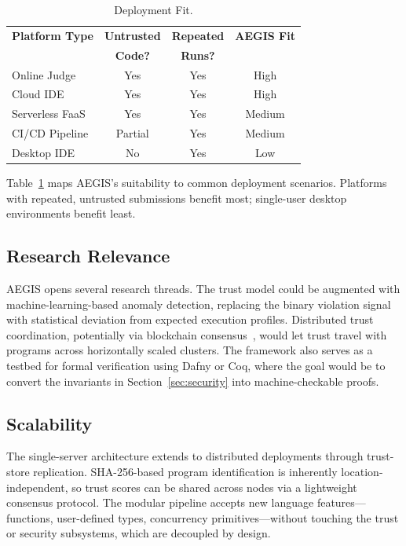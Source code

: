 \documentclass[conference]{IEEEtran}
\begin{document}
\begin{table}[t]
\caption{Deployment Fit.}
\label{tab:deploy_fit}
\centering
\renewcommand{\arraystretch}{1.15}
\footnotesize
\begin{tabular}{@{} l c c c @{}}
\toprule
\textbf{Platform Type} &
\textbf{Untrusted} &
\textbf{Repeated} &
\textbf{AEGIS Fit} \\
                       & \textbf{Code?} & \textbf{Runs?} & \\
\midrule
Online Judge       & Yes & Yes & High   \\
Cloud IDE          & Yes & Yes & High   \\
Serverless FaaS    & Yes & Yes & Medium \\
CI/CD Pipeline     & Partial & Yes & Medium \\
Desktop IDE        & No  & Yes & Low    \\
\bottomrule
\end{tabular}
\end{table}

Table~\ref{tab:deploy_fit} maps AEGIS's suitability to
common deployment scenarios.  Platforms with repeated,
untrusted submissions benefit most; single-user desktop
environments benefit least.

\subsection{Research Relevance}

AEGIS opens several research threads.  The trust model could
be augmented with machine-learning-based anomaly detection,
replacing the binary violation signal with statistical
deviation from expected execution profiles.  Distributed
trust coordination, potentially via blockchain
consensus~\cite{fernandez2024sla,ullah2024deeptrust}, would
let trust travel with programs across horizontally scaled
clusters.  The framework also serves as a testbed for formal
verification using Dafny or Coq, where the goal would be to
convert the invariants in Section~\ref{sec:security} into
machine-checkable proofs.

\subsection{Scalability}

The single-server architecture extends to distributed
deployments through trust-store replication.  SHA-256-based
program identification is inherently location-independent,
so trust scores can be shared across nodes via a lightweight
consensus protocol.  The modular pipeline accepts new
language features---functions, user-defined types, concurrency
primitives---without touching the trust or security subsystems,
which are decoupled by design.
\end{document}
